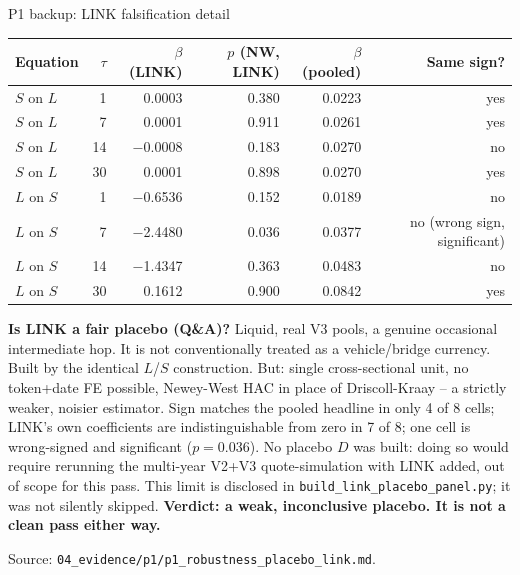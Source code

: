 \documentclass[aspectratio=169]{beamer}
\begin{document}
\begin{frame}{P1 backup: LINK falsification detail}
  \footnotesize
  \begin{center}
  \begin{tabular}{@{}l r r r r r@{}}
    \toprule
    Equation & $\tau$ & $\beta$ (LINK) & $p$ (NW, LINK) & $\beta$ (pooled) & Same sign? \\
    \midrule
    $S$ on $L$ & 1  & 0.0003  & 0.380 & 0.0223 & yes \\
    $S$ on $L$ & 7  & 0.0001  & 0.911 & 0.0261 & yes \\
    $S$ on $L$ & 14 & $-$0.0008 & 0.183 & 0.0270 & no \\
    $S$ on $L$ & 30 & 0.0001  & 0.898 & 0.0270 & yes \\
    $L$ on $S$ & 1  & $-$0.6536 & 0.152 & 0.0189 & no \\
    $L$ on $S$ & 7  & $-$2.4480 & 0.036 & 0.0377 & no (wrong sign, significant) \\
    $L$ on $S$ & 14 & $-$1.4347 & 0.363 & 0.0483 & no \\
    $L$ on $S$ & 30 & 0.1612  & 0.900 & 0.0842 & yes \\
    \bottomrule
  \end{tabular}
  \end{center}
  \vspace{0.3em}
  \scriptsize\textbf{Is LINK a fair placebo (Q\&A)?} Liquid, real V3 pools, a genuine occasional intermediate hop. It is not conventionally treated as a vehicle/bridge currency. Built by the identical $L$/$S$ construction. But: single cross-sectional unit, no token+date FE possible, Newey-West HAC in place of Driscoll-Kraay -- a strictly weaker, noisier estimator. Sign matches the pooled headline in only 4 of 8 cells; LINK's own coefficients are indistinguishable from zero in 7 of 8; one cell is wrong-signed and significant ($p=0.036$). No placebo $D$ was built: doing so would require rerunning the multi-year V2+V3 quote-simulation with LINK added, out of scope for this pass. This limit is disclosed in \texttt{build\_link\_placebo\_panel.py}; it was not silently skipped. \textbf{Verdict: a weak, inconclusive placebo. It is not a clean pass either way.}

  {\scriptsize Source: \texttt{04\_evidence/p1/p1\_robustness\_placebo\_link.md}.}
\end{frame}
\end{document}
